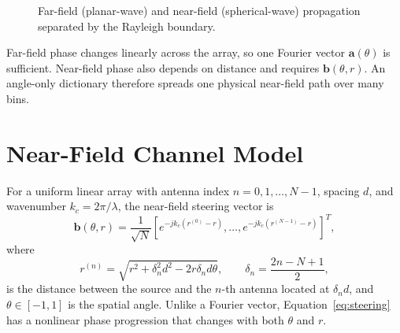 \documentclass[12pt,a4paper]{article}
\newcommand{\fieldvec}[1]{\boldsymbol{#1}}
\newcommand{\tightsection}[1]{\section{#1}\vspace{-0.35em}}
\begin{document}
\begin{figure}[ht]
  \centering
  \caption{Far-field (planar-wave) and near-field (spherical-wave)
  propagation separated by the Rayleigh boundary.}
  \label{fig:fields}
\end{figure}

Far-field phase changes linearly across the array, so one Fourier vector
$\fieldvec{a}(\theta)$ is sufficient. Near-field phase also depends on
distance and requires $\fieldvec{b}(\theta,r)$. An angle-only dictionary
therefore spreads one physical near-field path over many bins.

\tightsection{Near-Field Channel Model}

For a uniform linear array with antenna index $n=0,1,\ldots,N-1$,
spacing $d$, and wavenumber $k_c=2\pi/\lambda$, the near-field steering
vector is
\begin{equation}
  \fieldvec{b}(\theta,r)
  =\frac{1}{\sqrt{N}}
  \left[e^{-jk_c(r^{(0)}-r)},\ldots,
        e^{-jk_c(r^{(N-1)}-r)}\right]^{T},
  \label{eq:steering}
\end{equation}
where
\begin{equation}
  r^{(n)}=\sqrt{r^2+\delta_n^2d^2-2r\delta_n d\theta},
  \qquad \delta_n=\frac{2n-N+1}{2},
  \label{eq:distance}
\end{equation}
is the distance between the source and the $n$-th antenna located at
$\delta_n d$, and $\theta\in[-1,1]$ is the spatial angle. Unlike a
Fourier vector, Equation~\eqref{eq:steering} has a nonlinear phase
progression that changes with both $\theta$ and $r$.
\end{document}
